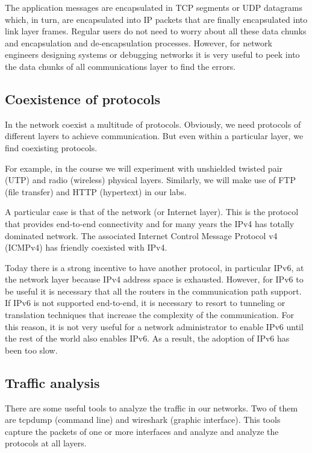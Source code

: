 The application messages are encapsulated in TCP segments or UDP datagrams which, in turn, are encapsulated into IP packets that are finally encapsulated into link layer frames.
Regular users do not need to worry about all these data chunks and encapsulation and de-encapsulation processes.
However, for network engineers designing systems or debugging networks it is very useful to peek into the data chunks of all communications layer to find the errors.

\subsection{Coexistence of protocols}

In the network coexist a multitude of protocols.
Obviously, we need protocols of different layers to achieve communication.
But even within a particular layer, we find coexisting protocols.

For example, in the course we will experiment with unshielded twisted pair (UTP) and radio (wireless) physical layers.
Similarly, we will make use of FTP (file transfer) and HTTP (hypertext) in our labs.

A particular case is that of the network (or Internet layer).
This is the protocol that provides end-to-end connectivity and for many years the IPv4 has totally dominated network.
The associated Internet Control Message Protocol v4 (ICMPv4) has friendly coexisted with IPv4.

Today there is a strong incentive to have another protocol, in particular IPv6, at the network layer because IPv4 address space is exhausted.
However, for IPv6 to be useful it is necessary that all the routers in the communication path support.
If IPv6 is not supported end-to-end, it is necessary to resort to tunneling or translation techniques that increase the complexity of the communication.
For this reason, it is not very useful for a network administrator to enable IPv6 until the rest of the world also enables IPv6.
As a result, the adoption of IPv6 has been too slow.

\subsection{Traffic analysis}

There are some useful tools to analyze the traffic in our networks.
Two of them are tcpdump (command line) and wireshark (graphic interface).
This tools capture the packets of one or more interfaces and analyze and analyze the protocols at all layers.

